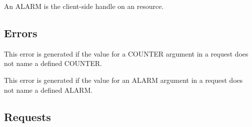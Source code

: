An ALARM is the client-side handle on an  resource.

\subsection*{Errors}

\begin{description}


This error is generated if the value for a COUNTER argument in a request does
not name a defined COUNTER.


This error is generated if the value for an ALARM argument in a request does
not name a defined ALARM.

\end{description}

\subsection*{Requests}

